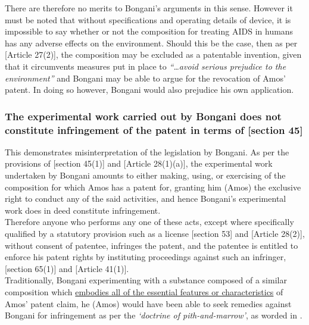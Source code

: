 \documentclass[11pt]{article}
\begin{document}
There are therefore no merits to Bongani's arguments in this sense. However it must be noted that without specifications and
operating details of device, it is impossible to say whether or not the composition for treating AIDS in humans has any adverse
effects on the environment. Should this be the case, then as per [Article 27(2)]\cite{wto17_trips}, the composition may be excluded
as a patentable invention, given that it circumvents measures put in place to \emph{``\ldots{}avoid serious prejudice to the environment''}
and Bongani may be able to argue for the revocation of Amos' patent. In doing so however, Bongani would also prejudice his own
application.

\subsubsection{The experimental work carried out by Bongani does not constitute infringement of the patent in terms of [section 45]\cite{rsa78_patents_act}}
\label{sec:org9743b72}
This demonstrates misinterpretation of the legislation by Bongani. As per the provisions of [section 45(1)]\cite{rsa78_patents_act}
and [Article 28(1)(a)]\cite{wto17_trips}, the experimental work undertaken by Bongani amounts to either making, using, or exercising
of the composition for which Amos has a patent for, granting him (Amos) the exclusive right to conduct any of the said activities,
and hence Bongani's experimental work does in deed constitute infringement.\\

Therefore anyone who performs any one of these acts, except where specifically qualified by a statutory provision such as a license [section 53]\cite{rsa78_patents_act} and [Article 28(2)]\cite{wto17_trips}, without consent of patentee, infringes the patent, and the patentee is entitled to enforce his patent rights by instituting proceedings against such an infringer, [section 65(1)]\cite{rsa78_patents_act} and [Article 41(1)]\cite{wto17_trips}.\\

Traditionally, Bongani experimenting with a substance composed of a similar
composition which \uline{embodies all of the essential features or characteristics} of
Amos' patent claim, he (Amos) would have been able to seek remedies against Bongani for infringement as per the \emph{`doctrine of pith-and-marrow'}, as worded in  \cite{steyn60_frank_hirch_v_rodi_wien}.\\
\end{document}

